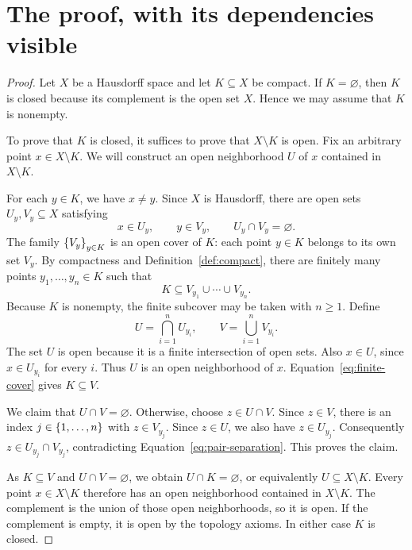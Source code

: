 \documentclass[11pt]{article}
\begin{document}
\section{The proof, with its dependencies visible}
\begin{proof}
Let $X$ be a Hausdorff space and let $K\subseteq X$ be compact. If
$K=\varnothing$, then $K$ is closed because its complement is the open
set $X$. Hence we may assume that $K$ is nonempty.

To prove that $K$ is closed, it suffices to prove that $X\setminus K$ is
open. Fix an arbitrary point $x\in X\setminus K$. We will construct an
open neighborhood $U$ of $x$ contained in $X\setminus K$.

For each $y\in K$, we have $x\ne y$. Since $X$ is Hausdorff, there are
open sets $U_y,V_y\subseteq X$ satisfying
\begin{equation}\label{eq:pair-separation}
  x\in U_y,\qquad y\in V_y,\qquad U_y\cap V_y=\varnothing.
\end{equation}
The family $\left\{V_y\right\}_{y\in K}$ is an open cover of $K$: each point
$y\in K$ belongs to its own set $V_y$. By compactness and
Definition~\ref{def:compact}, there are finitely many points
$y_1,\ldots,y_n\in K$ such that
\begin{equation}\label{eq:finite-cover}
  K\subseteq V_{y_1}\cup\cdots\cup V_{y_n}.
\end{equation}
Because $K$ is nonempty, the finite subcover may be taken with $n\geq1$.
Define
\begin{equation}\label{eq:chosen-neighborhood}
  U=\bigcap_{i=1}^{n}U_{y_i},
  \qquad
  V=\bigcup_{i=1}^{n}V_{y_i}.
\end{equation}
The set $U$ is open because it is a finite intersection of open sets.
Also $x\in U$, since $x\in U_{y_i}$ for every $i$. Thus $U$ is an
open neighborhood of $x$. Equation~\ref{eq:finite-cover} gives
$K\subseteq V$.

We claim that $U\cap V=\varnothing$. Otherwise, choose $z\in U\cap V$.
Since $z\in V$, there is an index $j\in\left\{1,\ldots,n\right\}$ with
$z\in V_{y_j}$. Since $z\in U$, we also have $z\in U_{y_j}$.
Consequently $z\in U_{y_j}\cap V_{y_j}$, contradicting
Equation~\ref{eq:pair-separation}. This proves the claim.

As $K\subseteq V$ and $U\cap V=\varnothing$, we obtain
$U\cap K=\varnothing$, or equivalently $U\subseteq X\setminus K$.
Every point $x\in X\setminus K$ therefore has an open neighborhood
contained in $X\setminus K$. The complement is the union of those open
neighborhoods, so it is open. If the complement is empty, it is open by
the topology axioms. In either case $K$ is closed.
\end{proof}
\end{document}
